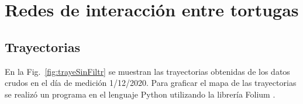 \chapter{Redes de interacción entre tortugas}
\graphicspath{{figs/}}
 
 
\label{Redes de interacción entre tortugas}
\section{Trayectorias }
 
En la Fig.~\ref{fig:trayeSinFiltr} se muestran las trayectorias obtenidas de los datos crudos en el día de medición 1/12/2020. Para graficar el mapa de las trayectorias se realizó un programa en el lenguaje Python utilizando la librería Folium \cite{github}.
 
